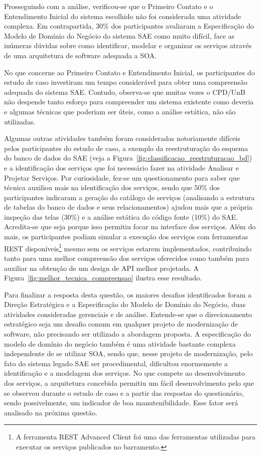 Prosseguindo com a análise, verificou-se que o Primeiro Contato e o Entendimento Inicial do sistema escolhido não foi considerada uma atividade complexa. Em contrapartida, 30\% dos participantes avaliaram a Especificação do Modelo de Domínio do Negócio do sistema \acrshort{SAE} como muito difícil, face as inúmeras dúvidas sobre como identificar, modelar e organizar os serviços através de uma arquitetura de software adequada a \acrshort{SOA}. 

No que concerne ao Primeiro Contato e Entendimento Inicial, os participantes do estudo de caso investiram um tempo considerável para obter uma compreensão adequada do sistema \acrshort{SAE}. Contudo, observa-se que muitas vezes o CPD/UnB não despende tanto esforço para compreender um sistema existente como deveria e algumas técnicas que poderiam ser úteis, como a análise estática, não são utilizadas. 

Algumas outras atividades também foram consideradas notoriamente difíceis 
pelos participantes do estudo de caso, a exemplo da reestruturação do esquema do banco de dados do \acrshort{SAE} (veja a Figura~\ref{fig:classificacao_reestruturacao_bd}) e a identificação dos serviços que foi necessário fazer na atividade Analisar e Projetar Serviços. Por curiosidade, fez-se um questionamento para saber que técnica auxiliou mais na identificação dos serviços, sendo que 50\% dos participantes indicaram a geração do catálogo de serviços (analisando a estrutura de tabelas do banco de dados e seus relacionamentos) ajudou mais que a própria inspeção das telas (30\%) e a análise estática do código fonte (10\%) do \acrshort{SAE}. Acredita-se que seja porque isso permitiu focar na interface dos serviços. Além do mais, os participantes podiam simular a execução dos serviços com ferramentas \acrshort{REST} disponíveis\footnote{A ferramenta \acrshort{REST} Advanced Client foi uma das ferramentas utilizadas para executar os serviços publicados no barramento.} mesmo sem os serviços estarem implementados, contribuindo tanto para uma melhor compreensão dos serviços oferecidos como também para auxiliar na obtenção de um design de \acrshort{API} melhor projetada. A Figura~\ref{fig:melhor_tecnica_compreensao} ilustra esse resultado. 


Para finalizar a resposta desta questão, os maiores desafios identificados foram a Direção Estratégica e a Especificação do Modelo de Domínio do Negócio, duas atividades consideradas gerenciais e de análise. Entende-se que o direcionamento estratégico seja um desafio comum em qualquer projeto de modernização de software, não precisando ser utilizado a abordagem proposta. A especificação do modelo de domínio do negócio também é uma atividade bastante complexa independente de se utilizar SOA, sendo que, nesse projeto de modernização, pelo fato do sistema legado \acrshort{SAE} ser procedimental, dificultou enormemente a identificação e a modelagem dos serviços. No que compete ao desenvolvimento dos serviços, a arquitetura concebida permitiu um fácil desenvolvimento pelo que se observou durante o estudo de caso e a partir das respostas do questionário, sendo possivelmente, um indicador de boa manutenibilidade. Esse fator será analisado na próxima questão.






